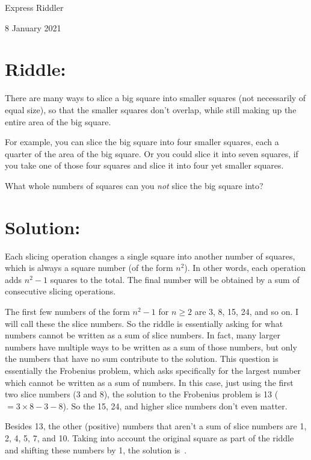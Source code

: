 \documentclass{article}
\begin{document}
\pagestyle{empty} %

\begin{center}
{\LARGE Express Riddler}

\vspace{0.15in}

{\Large 8 January 2021}
\end{center}


\section*{Riddle:}

There are many ways to slice a big square into smaller squares (not necessarily of equal size), so that the smaller squares don’t overlap, while still making up the entire area of the big square.

For example, you can slice the big square into four smaller squares, each a quarter of the area of the big square.
Or you could slice it into seven squares, if you take one of those four squares and slice it into four yet smaller squares.

What whole numbers of squares can you \textit{not} slice the big square into?


\section*{Solution:}

Each slicing operation changes a single square into another number of squares, which is always a square number (of the form $n^{2}$).
In other words, each operation adds $n^{2}-1$ squares to the total.
The final number will be obtained by a sum of consecutive slicing operations.

The first few numbers of the form $n^{2}-1$ for $n\geq2$ are 3, 8, 15, 24, and so on.
I will call these the slice numbers.
So the riddle is essentially asking for what numbers cannot be written as a sum of slice numbers.
In fact, many larger numbers have multiple ways to be written as a sum of those numbers, but only the numbers that have no sum contribute to the solution.
This question is essentially the Frobenius problem, which asks specifically for the largest number which cannot be written as a sum of numbers.
In this case, just using the first two slice numbers (3 and 8), the solution to the Frobenius problem is 13 ($=3\times8-3-8$).
So the 15, 24, and higher slice numbers don't even matter.

Besides 13, the other (positive) numbers that aren't a sum of slice numbers are 1, 2, 4, 5, 7, and 10.
Taking into account the original square as part of the riddle and shifting these numbers by 1, the solution is
\,.
\end{document}
